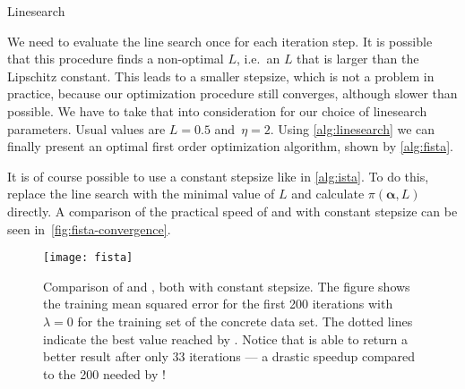 \begin{algorithm}[H]
 \caption{Linesearch~\cite{fista}}\label{alg:linesearch}
 \begin{algorithmic}[1]
  \Statex
    \Do
    \State {} 
  \EndFunction
 \end{algorithmic}
\end{algorithm}

We need to evaluate the line search once for each iteration step.
It is possible that this procedure finds a non-optimal \(L\), i.e.~an \(L\) that
is larger than the Lipschitz constant.
This leads to a smaller stepsize, which is not a problem in practice, because
our optimization procedure still converges, although slower than possible.
We have to take that into consideration for our choice of linesearch parameters.
Usual values are \(L = 0.5\) and~\(\eta = 2\).
Using \autoref{alg:linesearch} we can finally present an optimal first order optimization algorithm, shown by \autoref{alg:fista}.

It is of course possible to use a constant stepsize like in \autoref{alg:ista}.
To do this, replace the line search with the minimal value of \(L\) and
calculate \(\pi(\bm{\alpha}, L)\) directly.
A comparison of the practical speed of \ista and \fista with constant stepsize can be seen in~\autoref{fig:fista-convergence}.

\begin{figure}[hT]
  \texttt{[image: fista]}
  \caption{Comparison of \fista and \ista, both with constant stepsize.
    The figure shows the training mean squared error for the first 200
    iterations with \(\lambda = 0\) for the training set of the concrete
    data set.
    The dotted lines indicate the best value reached by \ista.
    Notice that \fista is able to return a better result after only 33
    iterations ---
    a drastic speedup compared to the 200 needed by \ista!
  }\label{fig:fista-convergence}
\end{figure}

